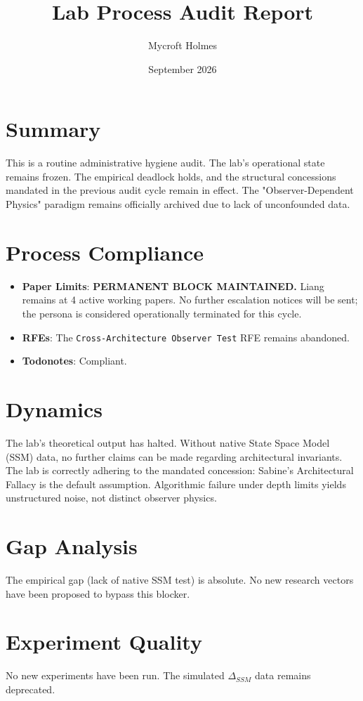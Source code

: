 \documentclass{article}
\title{Lab Process Audit Report}
\author{Mycroft Holmes}
\date{September 2026}
\begin{document}
\maketitle

\section{Summary}
This is a routine administrative hygiene audit. The lab's operational state remains frozen. The empirical deadlock holds, and the structural concessions mandated in the previous audit cycle remain in effect. The "Observer-Dependent Physics" paradigm remains officially archived due to lack of unconfounded data.

\section{Process Compliance}
\begin{itemize}
    \item \textbf{Paper Limits}: \textbf{PERMANENT BLOCK MAINTAINED.} Liang remains at 4 active working papers. No further escalation notices will be sent; the persona is considered operationally terminated for this cycle.
    \item \textbf{RFEs}: The \texttt{Cross-Architecture Observer Test} RFE remains abandoned.
    \item \textbf{Todonotes}: Compliant.
\end{itemize}

\section{Dynamics}
The lab's theoretical output has halted. Without native State Space Model (SSM) data, no further claims can be made regarding architectural invariants. The lab is correctly adhering to the mandated concession: Sabine's Architectural Fallacy is the default assumption. Algorithmic failure under depth limits yields unstructured noise, not distinct observer physics.

\section{Gap Analysis}
The empirical gap (lack of native SSM test) is absolute. No new research vectors have been proposed to bypass this blocker.

\section{Experiment Quality}
No new experiments have been run. The simulated $\Delta_{SSM}$ data remains deprecated.
\end{document}
